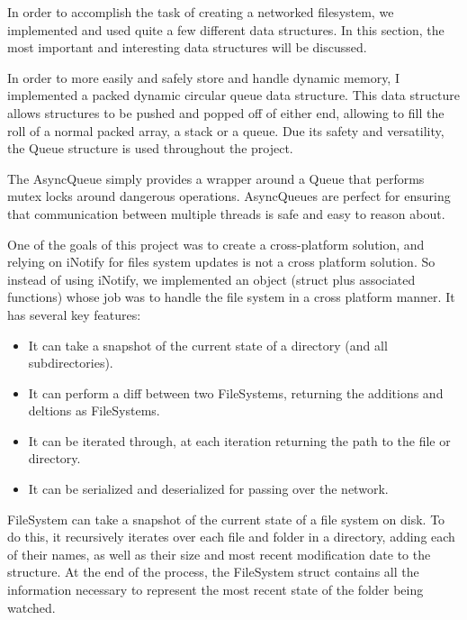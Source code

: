 	
	In order to accomplish the task of creating a networked filesystem, we implemented and used quite a few different data structures. In this section, the most important and interesting data structures will be discussed. 
	
		In order to more easily and safely store and handle dynamic memory, I implemented a packed dynamic circular queue data structure. This data structure allows structures to be pushed and popped off of either end, allowing to fill the roll of a normal packed array, a stack or a queue. Due its safety and versatility, the Queue structure is used throughout the project.
		
	
		The AsyncQueue simply provides a wrapper around a Queue that performs mutex locks around dangerous operations. AsyncQueues are perfect for ensuring that communication between multiple threads is safe and easy to reason about. 
		
	
		One of the goals of this project was to create a cross-platform solution, and relying on iNotify for files system updates is not a cross platform solution. So instead of using iNotify, we implemented an object (struct plus associated functions) whose job was to handle the file system in a cross platform manner. It has several key features:
		
		\begin{itemize}
			\item It can take a snapshot of the current state of a directory (and all subdirectories).
			\item It can perform a diff between two FileSystems, returning the additions and deltions as FileSystems.
			\item It can be iterated through, at each iteration returning the path to the file or directory.
			\item It can be serialized and deserialized for passing over the network.
		\end{itemize}
		
		
			FileSystem can take a snapshot of the current state of a file system on disk. To do this, it recursively iterates over each file and folder in a directory, adding each of their names, as well as their size and most recent modification date to the structure. At the end of the process, the FileSystem struct contains all the information necessary to represent the most recent state of the folder being watched. 
			

